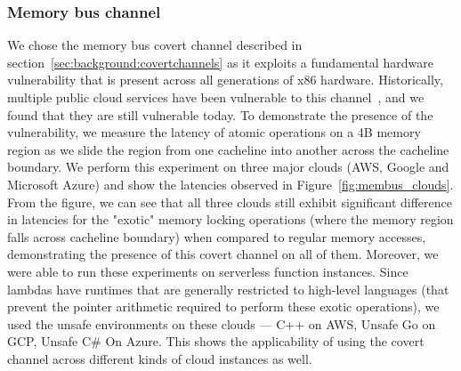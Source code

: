 
\subsubsection{Memory bus channel}
We chose the memory bus covert channel described in
section~\ref{sec:background:covertchannels} as it exploits a fundamental hardware
vulnerability that is present across all generations of x86 hardware.
Historically, multiple public cloud services have been vulnerable to this
channel~\cite{varad191016,zhang2016}, and we found that they are still
vulnerable today. To demonstrate the presence of the vulnerability, we measure
the latency of atomic operations on a 4B memory region as we slide the region
from one cacheline into another across the cacheline boundary. We perform this
experiment on three major clouds (AWS, Google and Microsoft Azure) and show the
latencies observed in Figure~\ref{fig:membus_clouds}. From the figure, we can
see that all three clouds still exhibit significant difference in latencies for
the "exotic" memory locking operations (where the memory region falls across
cacheline boundary) when compared to regular memory accesses, demonstrating the
presence of this covert channel on all of them. Moreover, we were able to run
these experiments on serverless function instances. Since lambdas have runtimes 
that are generally restricted to high-level languages
(that prevent the pointer arithmetic required to perform these exotic
operations), we used the unsafe environments on these clouds --- C++ on AWS,
Unsafe Go on GCP, Unsafe C\# On Azure. This shows the applicability of using the
covert channel across different kinds of cloud instances as well.


